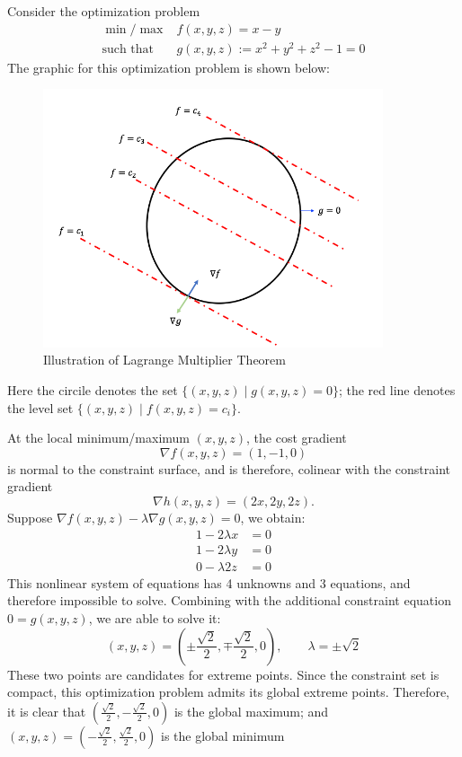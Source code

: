 \begin{example}
Consider the optimization problem
\begin{equation}
\begin{array}{ll}
\min/\max&f(x,y,z)=x-y\\
\mbox{such that}&g(x,y,z):=x^2+y^2+z^2-1=0
\end{array}
\end{equation}
The graphic for this optimization problem is shown below:
\begin{figure}[H]
\centering
\includegraphics[width=10cm]{week13/F_13_1}
\caption{Illustration of Lagrange Multiplier Theorem}
\end{figure}
Here the circile denotes the set $\{(x,y,z)\mid g(x,y,z)=0\}$; the red line denotes the level set $\{(x,y,z)\mid f(x,y,z)=c_i\}$.

At the local minimum/maximum $(x,y,z)$, the cost gradient 
\[
\nabla f(x,y,z)=(1,-1,0)
\] is normal to the constraint surface, and is therefore, colinear with the constraint gradient
\[
\nabla h(x,y,z)=(2x,2y,2z).
\]
Suppose $\nabla f(x,y,z)-\lambda\nabla g(x,y,z)=0$, we obtain:
\begin{align*}
1-2\lambda x&=0\\
1-2\lambda y&=0\\
0-\lambda2z&=0
\end{align*}
This nonlinear system of equations has 4 unknowns and 3 equations, and therefore impossible to solve. Combining with the additional constraint equation $0=g(x,y,z)$, we are able to solve it:
\[
(x,y,z)=(\pm\frac{\sqrt{2}}{2},\mp\frac{\sqrt{2}}{2},0),\qquad
\lambda=\pm\sqrt{2}
\]
These two points are candidates for extreme points. Since the constraint set is compact, this optimization problem admits its global extreme points. Therefore, it is clear that $(\frac{\sqrt{2}}{2},-\frac{\sqrt{2}}{2},0)$ is the global maximum; and $(x,y,z)=(-\frac{\sqrt{2}}{2},\frac{\sqrt{2}}{2},0)$ is the global minimum
\end{example}

